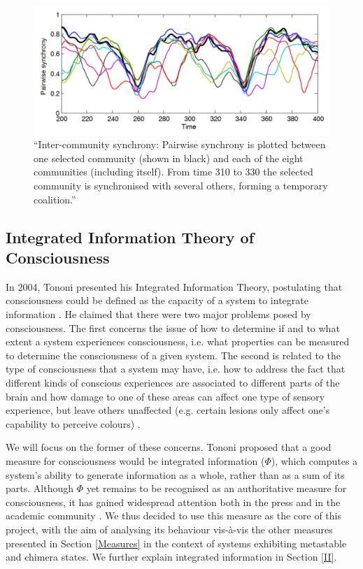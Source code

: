 \documentclass[a4paper,11pt]{article}
\begin{document}
\begin{figure}[H]
\centering
\includegraphics[scale = 0.5]{Shanahan2010_Chimera}
\caption{
	``Inter-community synchrony: Pairwise synchrony is plotted between one selected community (shown in black) and each of the eight communities (including itself). From time 310 to 330 the selected community is synchronised with several others, forming a temporary coalition.'' \cite{Shanahan2010}
	\label{Shanahan2010_Chimera}
}
\end{figure}

\subsection{Integrated Information Theory of Consciousness}
In 2004, Tononi presented his Integrated Information Theory, postulating that consciousness could be defined as the capacity of a system to integrate information \cite{Tononi2004}. He claimed that there were two major problems posed by consciousness. The first concerns the issue of how to determine if and to what extent a system experiences consciousness, i.e. what properties can be measured to determine the consciousness of a given system. The second is related to the type of consciousness that a system may have, i.e. how to address the fact that different kinds of conscious experiences are associated to different parts of the brain and how damage to one of these areas can affect one type of sensory experience, but leave others unaffected (e.g. certain lesions only affect one's capability to perceive colours) \cite{Tononi2008a}.

We will focus on the former of these concerns. Tononi proposed that a good measure for consciousness would be integrated information ($\Phi$), which computes a system's ability to generate information as a whole, rather than as a sum of its parts. Although $\Phi$ yet remains to be recognised as an authoritative measure for consciousness, it has gained widespread attention both in the press and in the academic community \cite{NewYorkTimes}. We thus decided to use this measure as the core of this project, with the aim of analysing its behaviour vis-\`{a}-vis the other measures presented in Section \ref{Measures} in the context of systems exhibiting metastable and chimera states. We further explain integrated information in Section \ref{II}.
\end{document}
